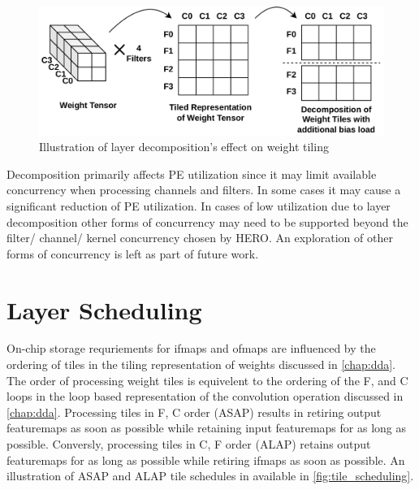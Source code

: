\begin{figure}[ht]
    \centering
    \includegraphics[scale=0.4]{fig/ofmap_decomposition_tiling_repr.pdf}
    \caption{Illustration of layer decomposition's effect on weight tiling}
    \label{fig:ofmap_decomposition:weight_tiling}
\end{figure}

Decomposition primarily affects PE utilization since it may limit available
concurrency when processing channels and filters. In some cases it may cause a
significant reduction of PE utilization. In cases of low utilization due to
layer decomposition other forms of concurrency may need to be supported beyond
the filter/ channel/ kernel concurrency chosen by HERO. An exploration of other
forms of concurrency is left as part of future work. 

\section{Layer Scheduling}
\label{chap:net_compile:layer_scheduling}

On-chip storage requriements for ifmaps and ofmaps are influenced by the
ordering of tiles in the tiling representation of weights discussed in
\autoref{chap:dda}. The order of processing weight tiles is equivelent to the
ordering of the F, and C loops in the loop based representation of the
convolution operation discussed in \autoref{chap:dda}. Processing tiles in F, C
order (ASAP) results in retiring output featuremaps as soon as possible while retaining
input featuremaps for as long as possible. Conversly, processing tiles in C, F
order (ALAP) retains output featuremaps for as long as possible while retiring ifmaps
as soon as possible. An illustration of ASAP and ALAP tile schedules in
available in \autoref{fig:tile_scheduling}. 

